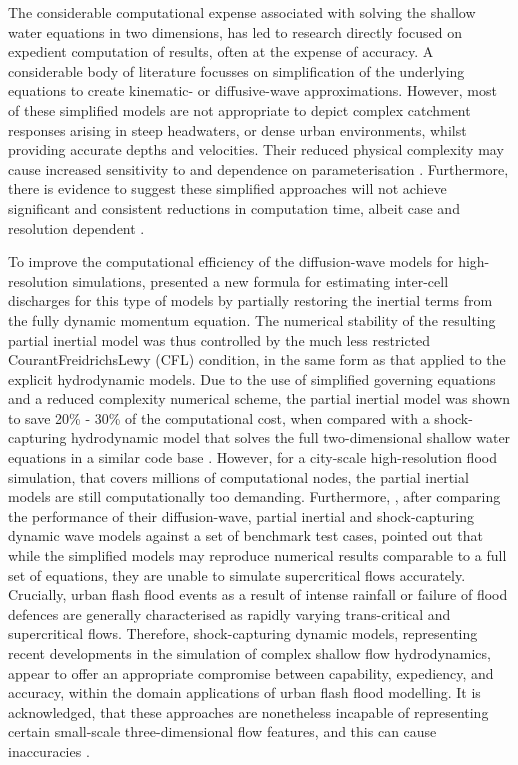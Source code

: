 The considerable computational expense associated with solving the shallow water equations in two dimensions, has led to research directly focused on expedient computation of results, often at the expense of accuracy. A considerable body of literature focusses on simplification of the underlying equations to create kinematic- or diffusive-wave approximations. However, most of these simplified models are not appropriate to depict complex catchment responses arising in steep headwaters, or dense urban environments, whilst providing accurate depths and velocities. Their reduced physical complexity may cause increased sensitivity to and dependence on parameterisation \citep{Costabile2009,Costabile2012,Fewtrell2011a,Yeh2011}. Furthermore, there is evidence to suggest these simplified approaches will not achieve significant and consistent reductions in computation time, albeit case and resolution dependent \citep{Hunter2007,Pender2010,Wang2011a}.

To improve the computational efficiency of the diffusion-wave models for high-resolution simulations, \citet{Bates2010} presented a new formula for estimating inter-cell discharges for this type of models by partially restoring the inertial terms from the fully dynamic momentum equation. The numerical stability of the resulting partial inertial model was thus controlled by the much less restricted Courant\textendash Freidrichs\textendash Lewy (CFL) condition, in the same form as that applied to the explicit hydrodynamic models. Due to the use of simplified governing equations and a reduced complexity numerical scheme, the partial inertial model was shown to save 20\% - 30\% of the computational cost, when compared with a shock-capturing hydrodynamic model that solves the full two-dimensional shallow water equations in a similar code base \citep{Zhang2014}. However, for a city-scale high-resolution flood simulation, that covers millions of computational nodes, the partial inertial models are still computationally too demanding. Furthermore, \citet{Neal2012}, after comparing the performance of their diffusion-wave, partial inertial and shock-capturing dynamic wave models against a set of benchmark test cases, pointed out that while the simplified models may reproduce numerical results comparable to a full set of equations, they are unable to simulate supercritical flows accurately. Crucially, urban flash flood events as a result of intense rainfall or failure of flood defences are generally characterised as rapidly varying trans-critical and supercritical flows. Therefore, shock-capturing dynamic models, representing recent developments in the simulation of complex shallow flow hydrodynamics, appear to offer an appropriate compromise between capability, expediency, and accuracy, within the domain applications of urban flash flood modelling. It is acknowledged, that these approaches are nonetheless incapable of representing certain small-scale three-dimensional flow features, and this can cause inaccuracies \citep{Soares-Frazao2008,Guinot2012}. 

